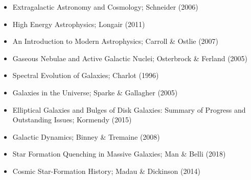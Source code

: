 \documentclass[a4paper,11pt]{article}
\begin{document}
\begin{itemize}
    \item Extragalactic Astronomy and Cosmology; Schneider (2006)
    \item High Energy Astrophysics; Longair (2011)
    \item An Introduction to Modern Astrophysics; Carroll \& Ostlie (2007)
    \item Gaseous Nebulae and Active Galactic Nuclei; Osterbrock \& Ferland (2005)
    \item Spectral Evolution of Galaxies; Charlot (1996)
    \item Galaxies in the Universe; Sparke \& Gallagher (2005)
    \item Elliptical Galaxies and Bulges of Disk Galaxies: Summary of Progress and Outstanding Issues; Kormendy (2015)
    \item Galactic Dynamics; Binney \& Tremaine (2008)
    \item Star Formation Quenching in Massive Galaxies; Man \& Belli (2018)
    \item Cosmic Star-Formation History; Madau \& Dickinson (2014)
\end{itemize}
\end{document}
